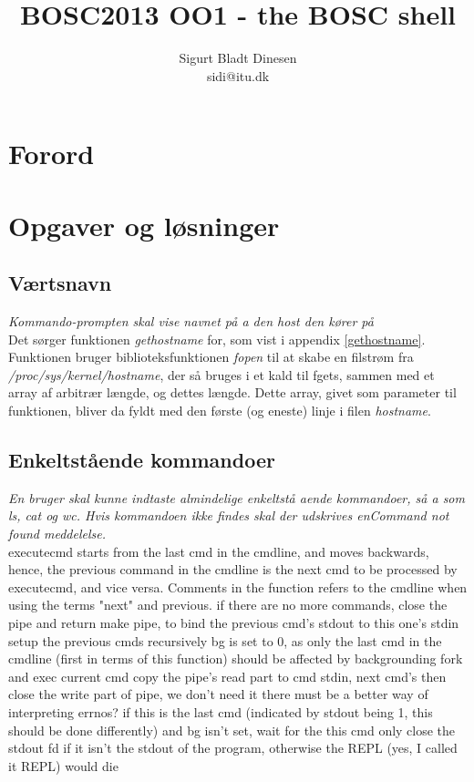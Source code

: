 \documentclass[a4paper, titlepage, draft]{article}
\begin{document}
\title{BOSC2013 OO1 - the BOSC shell}
\author{Sigurt Bladt Dinesen \\sidi{@}itu.dk}
\maketitle
\section*{Forord}
\section*{Opgaver og løsninger}
\subsection*{Værtsnavn}
\textit{Kommando-prompten skal vise navnet på a den host den kører på}\\

Det sørger funktionen \emph{gethostname} for, som vist i appendix
\ref{gethostname}. Funktionen bruger biblioteksfunktionen \emph{fopen} til at
skabe en filstrøm fra\\\emph{/proc/sys/kernel/hostname}, der så bruges i et kald
til fgets, sammen med et array af arbitrær længde, og dettes længde. Dette
array, givet som parameter til funktionen, bliver da fyldt med den første (og
eneste) linje i filen \emph{hostname}.

\subsection*{Enkeltstående kommandoer}
\textit{ En bruger skal kunne indtaste almindelige enkeltstå aende kommandoer, så a som
	ls, cat og wc. Hvis kommandoen ikke findes skal der udskrives enCommand
	not found meddelelse.}\\

executecmd starts from the last cmd in the cmdline, and moves backwards,
hence, the previous command in the cmdline is the next cmd to be processed
by executecmd, and vice versa.
Comments in the function refers to the cmdline when using the terms "next"
and previous.
if there are no more commands,
close the pipe and return
make pipe, to bind the previous cmd's stdout to this one's stdin
setup the previous cmds recursively
bg is set to 0, as only the last cmd in the cmdline (first in terms of this function)
should be affected by backgrounding
fork and exec current cmd
copy the pipe's read part to cmd stdin,
next cmd's
then close the write part of pipe, we don't need it
there must be a better way of interpreting errnos?
if this is the last cmd (indicated by stdout being 1, this should be done
differently) and bg isn't set, wait for the this cmd
only close the stdout fd if it isn't the stdout of the program,
otherwise the REPL (yes, I called it REPL) would die
\newpage
\appendix

\end{document}

